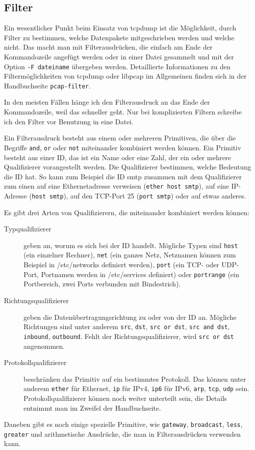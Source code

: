 \begin{normaltext}
  \subsection{Filter}

  Ein wesentlicher Punkt beim Einsatz von tcpdump ist die Möglichkeit, durch
  Filter zu bestimmen, welche Datenpakete mitgeschrieben werden und welche
  nicht. Das macht man mit Filterausdrücken, die einfach am Ende der
  Kommandozeile angefügt werden oder in einer Datei gesammelt und mit der
  Option \verb?-F dateiname? übergeben werden. Detaillierte Informationen zu
  den Filtermöglichkeiten von tcpdump oder libpcap im Allgemeinen finden sich
  in der Handbuchseite \verb?pcap-filter?.
  
  In den meisten Fällen hänge ich
  den Filterausdruck an das Ende der Kommandozeile, weil das schneller geht.
  Nur bei komplizierten Filtern schreibe ich den Filter vor Benutzung in eine
  Datei.

  Ein Filterausdruck besteht aus einem oder mehreren Primitiven, die über die
  Begriffe \verb?and?, \verb?or? oder \verb?not? miteinander kombiniert werden
  können. Ein Primitiv besteht aus einer ID, das ist ein Name oder eine Zahl,
  der ein oder mehrere Qualifizierer vorangestellt werden. Die Qualifizierer
  bestimmen, welche Bedeutung die ID hat. So kann zum Beispiel die ID smtp
  zusammen mit dem Qualifizierer zum einen auf eine Ethernetadresse verweisen
  (\verb?ether host smtp?), auf eine IP-Adresse (\verb?host smtp?), auf den
  TCP-Port 25 (\verb?port smtp?) oder auf etwas anderes.

  Es gibt drei Arten von Qualifizierern, die miteinander kombiniert werden
  können:
  \begin{description}
    \item[Typqualifizierer] geben an, worum es sich bei der ID handelt.
      Mögliche Typen sind \verb?host? (ein einzelner Rechner), \verb?net? (ein
      ganzes Netz, Netznamen können zum Beispiel in /etc/networks definiert
      werden), \verb?port? (ein TCP- oder UDP-Port, Portnamen werden in
      /etc/services definiert) oder \verb?portrange? (ein Portbereich, zwei
      Ports verbunden mit Bindestrich).
    \item[Richtungsqualifizierer] geben die Datenübertragungsrichtung zu oder
      von der ID an. Mögliche Richtungen sind unter anderem \verb?src?,
      \verb?dst?, \verb?src or dst?, \verb?src and dst?, \verb?inbound?,
      \verb?outbound?. Fehlt der Richtungsqualifizierer, wird
      \verb?src or dst? angenommen.
    \item[Protokollqualifizierer] beschränken das Primitiv auf ein bestimmtes
      Protokoll. Das können unter anderem \verb?ether? für Ethernet, \verb?ip?
      für IPv4, \verb?ip6? für IPv6, \verb?arp?, \verb?tcp?, \verb?udp? sein.
      Protokollqualifizierer können noch weiter unterteilt sein, die Details
      entnimmt man im Zweifel der Handbuchseite.
  \end{description}
  Daneben gibt es noch einige spezielle Primitive, wie \verb?gateway?,
  \verb?broadcast?, \verb?less?, \verb?greater? und arithmetische Ausdrücke,
  die man in Filterausdrücken verwenden kann.


\end{normaltext}
